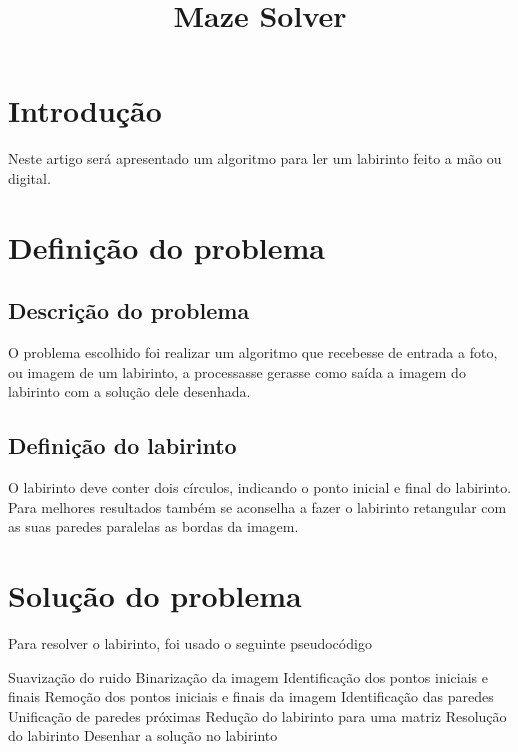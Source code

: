 \documentclass[conference]{IEEEtran}
\begin{document}
\title{Maze Solver
}

\author{
}

\maketitle

\section{Introdução}
Neste artigo será apresentado um algoritmo para ler um labirinto feito a mão ou digital.

\section{Definição do problema}

\subsection{Descrição do problema}
O problema escolhido foi realizar um algoritmo que recebesse de entrada a foto, ou imagem de um labirinto, a processasse gerasse como saída a imagem do labirinto com a solução dele desenhada.
\subsection {Definição do labirinto}
O labirinto deve conter dois círculos, indicando o ponto inicial e final do labirinto. Para melhores resultados também se aconselha a fazer o labirinto retangular com as suas paredes paralelas as bordas da imagem.


\section{Solução do problema}
Para resolver o labirinto, foi usado o seguinte pseudocódigo
\begin{algorithm}[H]
Suavização do ruido\;
Binarização da imagem\;
Identificação dos pontos iniciais e finais\;
Remoção dos pontos iniciais e finais da imagem\;
Identificação das paredes\;
Unificação de paredes próximas\;
Redução do labirinto para uma matriz\;
Resolução do labirinto\;
Desenhar a solução no labirinto\;
\end{algorithm}
\end{document}
